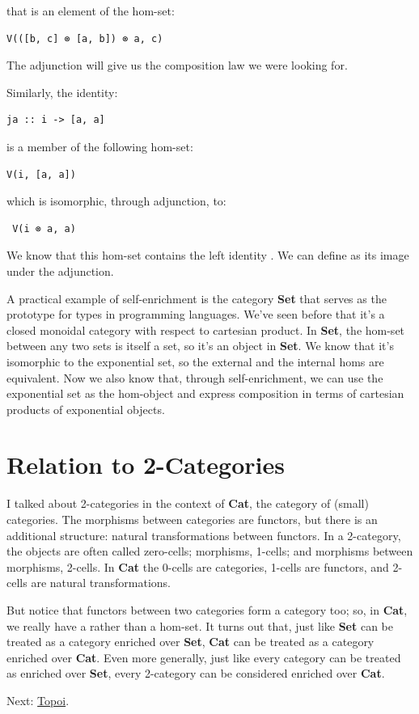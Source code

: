 that is an element of the hom-set:

\begin{verbatim}
V(([b, c] ⊗ [a, b]) ⊗ a, c)
\end{verbatim}

The adjunction will give us the composition law we were looking for.

Similarly, the identity:

\begin{verbatim}
ja :: i -> [a, a]
\end{verbatim}

is a member of the following hom-set:

\begin{verbatim}
V(i, [a, a])
\end{verbatim}

which is isomorphic, through adjunction, to:

\begin{verbatim}
 V(i ⊗ a, a)
\end{verbatim}

We know that this hom-set contains the left identity . We can
define  as its image under the adjunction.

A practical example of self-enrichment is the category \textbf{Set} that
serves as the prototype for types in programming languages. We've seen
before that it's a closed monoidal category with respect to cartesian
product. In \textbf{Set}, the hom-set between any two sets is itself a
set, so it's an object in \textbf{Set}. We know that it's isomorphic to
the exponential set, so the external and the internal homs are
equivalent. Now we also know that, through self-enrichment, we can use
the exponential set as the hom-object and express composition in terms
of cartesian products of exponential objects.

\section{Relation to 2-Categories}\label{relation-to-2-categories}

I talked about 2-categories in the context of \textbf{Cat}, the category
of (small) categories. The morphisms between categories are functors,
but there is an additional structure: natural transformations between
functors. In a 2-category, the objects are often called zero-cells;
morphisms, 1-cells; and morphisms between morphisms, 2-cells. In
\textbf{Cat} the 0-cells are categories, 1-cells are functors, and
2-cells are natural transformations.

But notice that functors between two categories form a category too; so,
in \textbf{Cat}, we really have a  rather than a
hom-set. It turns out that, just like \textbf{Set} can be treated as a
category enriched over \textbf{Set}, \textbf{Cat} can be treated as a
category enriched over \textbf{Cat}. Even more generally, just like
every category can be treated as enriched over \textbf{Set}, every
2-category can be considered enriched over \textbf{Cat}.

Next: \href{https://bartoszmilewski.com/2017/07/22/topoi/}{Topoi}.
